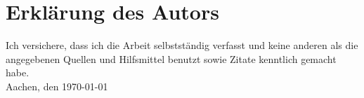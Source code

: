 \chapter*{Erklärung des Autors}

Ich versichere, dass ich die Arbeit selbstständig verfasst und keine anderen als die
angegebenen Quellen und Hilfsmittel benutzt sowie Zitate kenntlich gemacht habe. \\

Aachen, den \completedategerman\today 